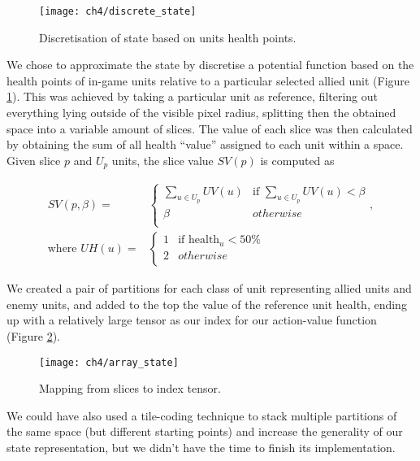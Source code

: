 \begin{figure}[h]
    \centering
    \texttt{[image: ch4/discrete\_state]}
    \caption{Discretisation of state based on units health points.}
    \label{fig:discrete_state}
\end{figure}

We chose to approximate the state by discretise a potential function
\citep{diebelthrun} based on the health points of in-game units relative to a
particular selected allied unit (Figure \ref{fig:discrete_state}). This was
achieved by taking a particular unit as reference, filtering out everything
lying outside of the visible pixel radius, splitting then the obtained space
into a variable amount of slices. The value of each slice was then calculated by
obtaining the sum of all health ``value'' assigned to each unit within a space.
Given slice $p$ and $U_p$ units, the slice value $SV(p)$ is computed as

\begin{equation}
  \begin{aligned}
    SV(p, \beta) = & 
    \begin{cases}
      \sum_{u \in U_p}{UV(u)} & \text{if } \sum_{u \in U_p}{UV(u)} < \beta \\
      \beta & otherwise\\
    \end{cases}, \\ \text{where } 
    UH(u) = &
    \begin{cases}
      1 & \text{if } \text{health}_u < 50\%\\
      2 & otherwise \\
    \end{cases} 
  \end{aligned}
\end{equation}

We created a pair of partitions for each class of unit representing allied units
and enemy units, and added to the top the value of the reference unit health,
ending up with a relatively large tensor as our index for our action-value
function (Figure \ref{fig:array_state}).

\begin{figure}[h]
    \centering
    \texttt{[image: ch4/array\_state]}
    \caption{Mapping from slices to index tensor.}
    \label{fig:array_state}
\end{figure}

We could have also used a tile-coding technique\citep{stone_sutton_keepaway} to
stack multiple partitions of the same space (but different starting points) and
increase the generality of our state representation, but we didn't have the time
to finish its implementation.

